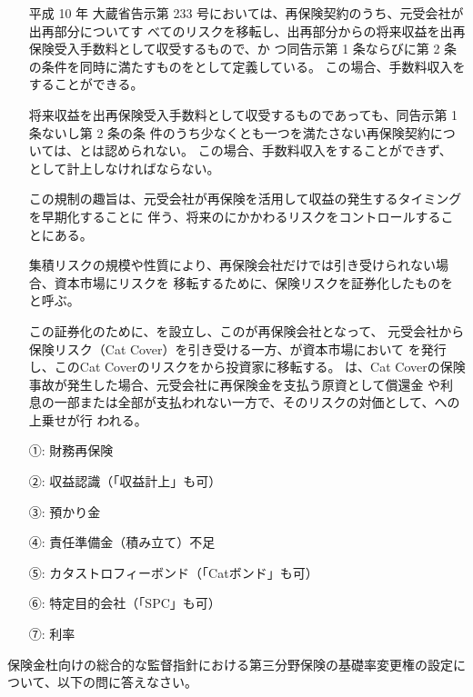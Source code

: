 \documentclass[report,gutter=10mm,fore-edge=10mm,uplatex,dvipdfmx]{jlreq}
\begin{document}
\begin{itemize}
\item[] 平成 10 年 大蔵省告示第 233 号においては、再保険契約のうち、元受会社が出再部分についてす
 べてのリスクを移転し、出再部分からの将来収益を出再保険受入手数料として収受するもので、か
 つ同告示第 1 条ならびに第 2 条の条件を同時に満たすものをとして定義している。
 この場合、手数料収入をすることができる。

\item[] 将来収益を出再保険受入手数料として収受するものであっても、同告示第 1 条ないし第 2 条の条
 件のうち少なくとも一つを満たさない再保険契約については、とは認められない。
 この場合、手数料収入をすることができず、
 として計上しなければならない。

\item[] この規制の趣旨は、元受会社が再保険を活用して収益の発生するタイミングを早期化することに
 伴う、将来のにかかわるリスクをコントロールすることにある。

\item[] 集積リスクの規模や性質により、再保険会社だけでは引き受けられない場合、資本市場にリスクを
 移転するために、保険リスクを証券化したものをと呼ぶ。

\item[] この証券化のために、を設立し、このが再保険会社となって、
 元受会社から保険リスク（Cat Cover）を引き受ける一方、が資本市場において
 を発行し、このCat Coverのリスクをから投資家に移転する。
 は、Cat Coverの保険事故が発生した場合、元受会社に再保険金を支払う原資として償還金
 や利息の一部または全部が支払われない一方で、そのリスクの対価として、への上乗せが行
 われる。
\end{itemize}

\answer{}
\begin{itemize}
\item[ ①: ] 財務再保険
\item[ ②: ] 収益認識（「収益計上」も可）
\item[ ③: ] 預かり金
\item[ ④: ] 責任準備金（積み立て）不足
\item[ ⑤: ] カタストロフィーボンド（「Catボンド」も可）
\item[ ⑥: ] 特定目的会社（「SPC」も可）
\item[ ⑦: ] 利率
\end{itemize}

保険金杜向けの総合的な監督指針における第三分野保険の基礎率変更権の設定について、以下の問に答えなさい。
\end{document}
